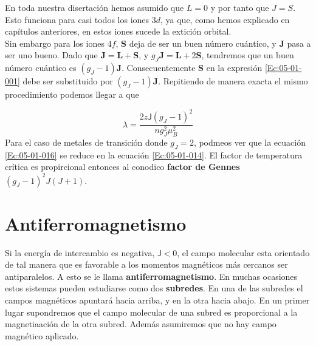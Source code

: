 \documentclass[12pt,a4paper]{book}
\numberwithin{equation}{section}
\numberwithin{figure}{section}
\newcommand{\Jsf}{\mathsf{J}}
\newcommand{\Jn}{\mathbf{J}}
\newcommand{\Ln}{\mathbf{L}}
\newcommand{\Sn}{\mathbf{S}}
\begin{document}
En toda nuestra disertación hemos asumido que $L=0$ y por tanto que $J=S$. Esto funciona para casi todos los iones $3d$, ya que, como hemos explicado en capítulos anteriores, en estos iones sucede la extición orbital. \\

Sin embargo para los iones $4f$, $\Sn$ deja de ser un buen número cuántico, y $\Jn$ pasa a ser uno bueno. Dado que $\Jn=\Ln+\Sn$, y $g_J \Jn = \Ln + 2 \Sn$, tendremos que un buen número cuántico es $(g_J-1)\Jn$. Consecuentemente $\Sn$ en la expresión \ref{Ec:05-01-001} debe ser substituido por $(g_J-1)\Jn$. Repitiendo de manera exacta el mismo procedimiento podemos llegar a que

\begin{equation}
    \lambda = \frac{2 z \Jsf (g_J-1)^2}{n g_J^2 \mu_B^2} \label{Ec:05-01-016}
\end{equation}
Para el caso de metales de transición donde $g_J=2$, podmeos ver que la ecuación \ref{Ec:05-01-016} se reduce en la ecuación \ref{Ec:05-01-014}. El factor de temperatura crítica es propircional entonces al conodico \textbf{factor de Gennes} $(g_J-1)^2J(J+1)$.  

\section{Antiferromagnetismo}

Si la energía de intercambio es negativa, $\Jsf<0$, el campo molecular esta orientado de tal manera que es favorable a los momentos magnéticos más cercanos ser antiparalelos. A esto se le llama \textbf{antiferromagnetismo}. En muchas ocasiones estos sistemas pueden estudiarse como dos \textbf{subredes}. En una de las subredes el campos magnéticos apuntará hacia arriba, y en la otra hacia abajo. En un primer lugar supondremos que el campo molecular de una subred es proporcional a la magnetiaación de la otra subred. Además asumiremos que no hay campo magnético aplicado. 
\end{document}
